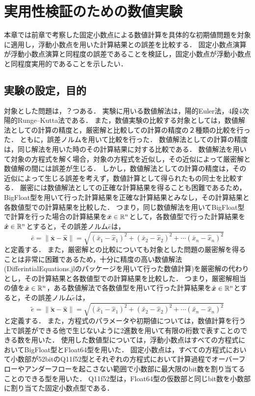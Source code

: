 \chapter{実用性検証のための数値実験}
\label{chap:数値実験}
本章では前章で考察した固定小数点による数値計算を具体的な初期値問題を対象に適用し，浮動小数点を用いた計算結果との誤差を比較する．
固定小数点演算が浮動小数点演算と同程度の誤差であることを検証し，固定小数点が浮動小数点と同程度実用的であることを示したい．
\section{実験の設定，目的}
対象とした問題は，？つある．
実験に用いる数値解法は，陽的Euler法，4段4次陽的Runge--Kutta法である．
また，数値実験の比較する対象としては，数値解法としての計算の精度と，厳密解と比較しての計算の精度の２種類の比較を行った．
ともに，誤差ノルムを用いて比較を行った．
数値解法としての計算の精度は，同じ解法を用いた時のその計算結果に対する比較である．
数値解法を用いて対象の方程式を解く場合，対象の方程式を近似し，その近似によって厳密解と数値解の間には誤差が生じる．
しかし，数値解法としての計算の精度は，その近似によって生じる誤差を考えず，数値計算として得られたもの同士を比較する．
厳密には数値解法としての正確な計算結果を得ることも困難であるため，BigFloat型を用いて行った計算結果を正確な計算結果とみなし，その計算結果と各数値型での計算結果を比較した．
つまり，同じ数値解法を用いてBigFloat型で計算を行った場合の計算結果を$\bar{\bm{x}} \in \mathbb{R}^n$として，各数値型で行った計算結果を$\hat{\bm{x}} \in \mathbb{R}^n$とすると，その誤差ノルム$\bar{e}$は，
\begin{equation*}
    \bar{e} = \|\bar{\bm{x}} - \hat{\bm{x}}\| = \sqrt{(\bar{x}_1 - \hat{x}_1)^2 + (\bar{x}_2 - \hat{x}_2)^2 + \cdots (\bar{x}_n - \hat{x}_n)^2}
\end{equation*}
と定義する．
また，厳密解との比較についても対象とした問題の厳密解を得ることは非常に困難であるため，十分に精度の高い数値解法(DifferintialEquations.jlのパッケージを用いて行った数値計算)を厳密解の代わりとし，その計算結果と各数値型での計算結果を比較した．
つまり，厳密解相当の値を$\tilde{\bm{x}} \in \mathbb{R}^n$，ある数値解法で各数値型を用いて行った計算結果を$\hat{\bm{x}} \in \mathbb{R}^n$とすると，その誤差ノルム$\tilde{e}$は，
\begin{equation*}
   \tilde{e}  = \|\tilde{\bm{x}} - \hat{\bm{x}}\| = \sqrt{(\tilde{x_1} - \hat{x}_1)^2 + (\tilde{x_2} - \hat{x}_2)^2 + \cdots (\tilde{x_n} - \hat{x}_n)^2}
\end{equation*}
と定義する．
また，方程式のパラメータや初期値については，数値計算を行う上で誤差ができる他で生じないように2進数を用いて有限の桁数で表すことのできる数を用いた．
使用した数値型については，浮動小数点はすべての方程式においてBigFloat型とFloat64型を用いた．
固定小数点は，すべての方程式において小数部が52bitのQ11f52型とそれぞれの方程式において計算過程でオーバーフローやアンダーフローを起こさない範囲で小数部に最大限のbit数を割り当てることのできる型を用いた．
Q11f52型は，Float64型の仮数部と同じbit数を小数部に割り当てた固定小数点型である．


